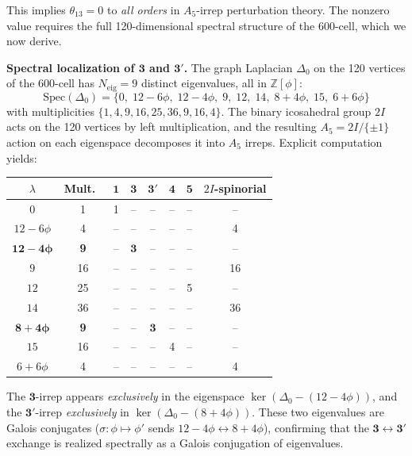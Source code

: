 \documentclass[12pt,a4paper]{article}
\theoremstyle{definition}
\begin{document}
\noindent This implies $\theta_{13} = 0$ to \emph{all orders} in $A_5$-irrep perturbation theory.  The nonzero value requires the full 120-dimensional spectral structure of the 600-cell, which we now derive.

\textbf{Spectral localization of $\mathbf{3}$ and $\mathbf{3'}$.}
The graph Laplacian $\Delta_0$ on the 120 vertices of the 600-cell has $N_{\text{eig}} = 9$ distinct eigenvalues, all in $\mathbb{Z}[\phi]$:
\begin{equation}
\mathrm{Spec}(\Delta_0) = \{0,\; 12\!-\!6\phi,\; 12\!-\!4\phi,\; 9,\; 12,\; 14,\; 8\!+\!4\phi,\; 15,\; 6\!+\!6\phi\}
\end{equation}
with multiplicities $\{1,4,9,16,25,36,9,16,4\}$.  The binary icosahedral group $2I$ acts on the 120 vertices by left multiplication, and the resulting $A_5 = 2I/\{\pm 1\}$ action on each eigenspace decomposes it into $A_5$ irreps.  Explicit computation yields:
\begin{center}
\renewcommand{\arraystretch}{1.1}
\begin{tabular}{cccccccc}
\toprule
$\lambda$ & Mult.\ & $\mathbf{1}$ & $\mathbf{3}$ & $\mathbf{3'}$ & $\mathbf{4}$ & $\mathbf{5}$ & $2I$-spinorial \\
\midrule
$0$ & 1 & 1 & -- & -- & -- & -- & -- \\
$12\!-\!6\phi$ & 4 & -- & -- & -- & -- & -- & 4 \\
$\mathbf{12\!-\!4\phi}$ & \textbf{9} & -- & $\mathbf{3}$ & -- & -- & -- & -- \\
$9$ & 16 & -- & -- & -- & -- & -- & 16 \\
$12$ & 25 & -- & -- & -- & -- & 5 & -- \\
$14$ & 36 & -- & -- & -- & -- & -- & 36 \\
$\mathbf{8\!+\!4\phi}$ & \textbf{9} & -- & -- & $\mathbf{3}$ & -- & -- & -- \\
$15$ & 16 & -- & -- & -- & 4 & -- & -- \\
$6\!+\!6\phi$ & 4 & -- & -- & -- & -- & -- & 4 \\
\bottomrule
\end{tabular}
\end{center}
\noindent The $\mathbf{3}$-irrep appears \emph{exclusively} in the eigenspace $\ker(\Delta_0 - (12-4\phi))$, and the $\mathbf{3'}$-irrep \emph{exclusively} in $\ker(\Delta_0 - (8+4\phi))$.  These two eigenvalues are Galois conjugates ($\sigma: \phi \mapsto \phi'$ sends $12-4\phi \leftrightarrow 8+4\phi$), confirming that the $\mathbf{3} \leftrightarrow \mathbf{3'}$ exchange is realized spectrally as a Galois conjugation of eigenvalues.
\end{document}
